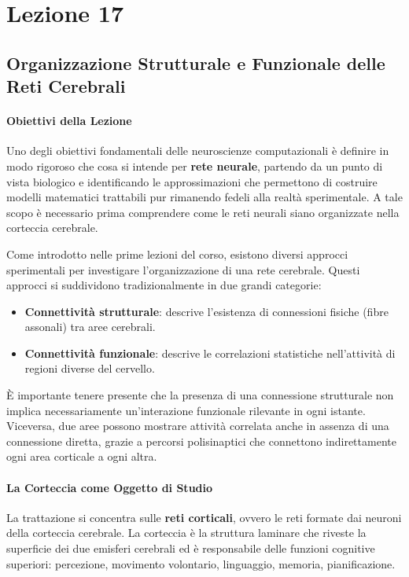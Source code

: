 \chapter{Lezione 17}


\section{Organizzazione Strutturale e Funzionale delle Reti Cerebrali}

\subsubsection{Obiettivi della Lezione}

Uno degli obiettivi fondamentali delle neuroscienze computazionali è definire in modo rigoroso che cosa si intende per \textbf{rete neurale}, partendo da un punto di vista biologico e identificando le approssimazioni che permettono di costruire modelli matematici trattabili pur rimanendo fedeli alla realtà sperimentale. A tale scopo è necessario prima comprendere come le reti neurali siano organizzate nella corteccia cerebrale.

Come introdotto nelle prime lezioni del corso, esistono diversi approcci sperimentali per investigare l'organizzazione di una rete cerebrale. Questi approcci si suddividono tradizionalmente in due grandi categorie:

\begin{itemize}
    \item \textbf{Connettività strutturale}: descrive l'esistenza di connessioni fisiche (fibre assonali) tra aree cerebrali.
    \item \textbf{Connettività funzionale}: descrive le correlazioni statistiche nell'attività di regioni diverse del cervello.
\end{itemize}

È importante tenere presente che la presenza di una connessione strutturale non implica necessariamente un'interazione funzionale rilevante in ogni istante. Viceversa, due aree possono mostrare attività correlata anche in assenza di una connessione diretta, grazie a percorsi polisinaptici che connettono indirettamente ogni area corticale a ogni altra.

\subsubsection{La Corteccia come Oggetto di Studio}

La trattazione si concentra sulle \textbf{reti corticali}, ovvero le reti formate dai neuroni della corteccia cerebrale. La corteccia è la struttura laminare che riveste la superficie dei due emisferi cerebrali ed è responsabile delle funzioni cognitive superiori: percezione, movimento volontario, linguaggio, memoria, pianificazione.



